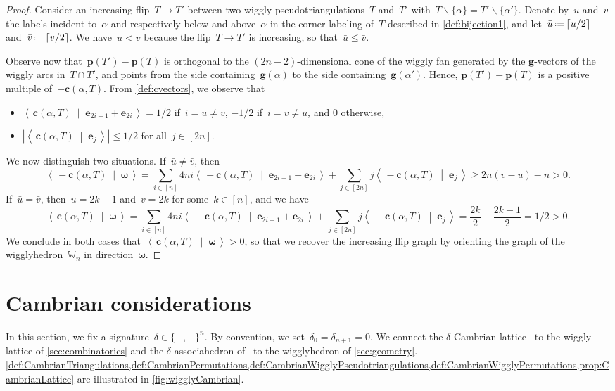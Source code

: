 \documentclass{amsart}
\theoremstyle{definition}
\renewcommand{\b}[1]{{\boldsymbol{#1}}} %
\newcommand{\ssm}{\smallsetminus} %
\newcommand{\dotprod}[2]{\left\langle \, #1 \; \middle| \; #2 \, \right\rangle} %
\newcommand{\eqdef}{\mbox{\,\raisebox{0.2ex}{\scriptsize\ensuremath{\mathrm:}}\ensuremath{=}\,}} %
\newcommand{\polytope}[1]{\mathds{#1}} %
\newcommand{\wigglyhedron}{\polytope{W}} %
\begin{document}
\begin{proof}
Consider an increasing flip~$T \to T'$ between two wiggly pseudotriangulations~$T$ and~$T'$ with~$T \ssm \{\alpha\} = T' \ssm \{\alpha'\}$.
Denote by~$u$ and~$v$ the labels incident to~$\alpha$ and respectively below and above~$\alpha$ in the corner labeling of~$T$ described in \cref{def:bijection1}, and let~$\bar u \eqdef \lceil u/2 \rceil$ and~$\bar v \eqdef \lceil v/2 \rceil$.
We have~$u < v$ because the flip~$T \to T'$ is increasing, so that~$\bar u \le \bar v$.

Observe now that~${\b{p}(T') - \b{p}(T)}$ is orthogonal to the $(2n-2)$-dimensional cone of the wiggly fan generated by the $\b{g}$-vectors of the wiggly arcs in~$T \cap T'$, and points from the side containing~$\b{g}(\alpha)$ to the side containing~$\b{g}(\alpha')$.
Hence, $\b{p}(T') - \b{p}(T)$ is a positive multiple of~$-\b{c}(\alpha, T)$.
From \cref{def:cvectors}, we observe that
\begin{itemize}
\item $\dotprod{\b{c}(\alpha, T)}{\b{e}_{2i-1} + \b{e}_{2i}} = 1/2$ if~$i = \bar u \ne \bar v$, $-1/2$ if~$i = \bar v \ne \bar u$, and $0$ otherwise,
\item $|\dotprod{\b{c}(\alpha, T)}{\b{e}_j}| \le 1/2$ for all~$j \in [2n]$.
\end{itemize}
We now distinguish two situations.
If~$\bar u \ne \bar v$, then
\[
\dotprod{-\b{c}(\alpha, T)}{\b{\omega}} = \sum_{i \in [n]} 4ni \dotprod{-\b{c}(\alpha, T)}{\b{e}_{2i-1} + \b{e}_{2i}} + \sum_{j \in [2n]} j \dotprod{-\b{c}(\alpha, T)}{\b{e}_j} \ge 2n(\bar v - \bar u) - n > 0.
\]
If~$\bar u = \bar v$, then~$u = 2k-1$ and~$v = 2k$ for some~$k \in [n]$, and we have
\[
\dotprod{\b{c}(\alpha, T)}{\b{\omega}} = \!\! \sum_{i \in [n]} 4ni \dotprod{-\b{c}(\alpha, T)}{\b{e}_{2i-1} + \b{e}_{2i}} + \!\! \sum_{j \in [2n]} j \dotprod{-\b{c}(\alpha, T)}{\b{e}_j} = \frac{2k}{2}-\frac{2k-1}{2} = 1/2 > 0.
\]
We conclude in both cases that~$\dotprod{\b{c}(\alpha, T)}{\b{\omega}} > 0$, so that we recover the increasing flip graph by orienting the graph of the wigglyhedron~$\wigglyhedron_n$ in direction~$\b{\omega}$.
\end{proof}


\section{Cambrian considerations}

In this section, we fix a signature~$\delta \in \{+,-\}^n$. By convention, we set~$\delta_0 = \delta_{n+1} = 0$.
We connect the $\delta$-Cambrian lattice~\cite{Reading-CambrianLattices} to the wiggly lattice of \cref{sec:combinatorics} and the $\delta$-associahedron of~\cite{HohlwegLange} to the wigglyhedron of \cref{sec:geometry}.
\cref{def:CambrianTriangulations,def:CambrianPermutations,def:CambrianWigglyPseudotriangulations,def:CambrianWigglyPermutations,prop:CambrianLattice} are illustrated in \cref{fig:wigglyCambrian}.
\end{document}
